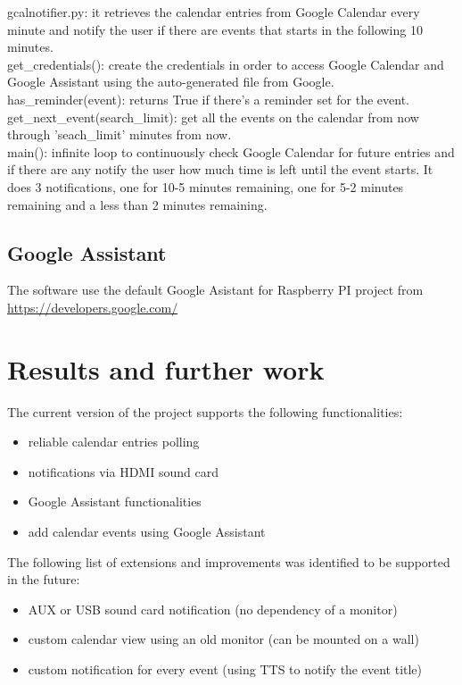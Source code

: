 \documentclass[a4paper,11pt]{article}
\begin{document}
gcalnotifier.py: it retrieves the calendar entries from Google Calendar every minute and notify the user if there are events that starts in the following 10 minutes.\\ 

get\_credentials(): create the credentials in order to access Google Calendar and Google Assistant using the auto-generated file from Google.\\

has\_reminder(event): returns True if there's a reminder set for the event.\\

get\_next\_event(search\_limit): get all the events on the calendar from now through 'seach\_limit' minutes from now.\\

main(): infinite loop to continuously check Google Calendar for future entries and if there are any notify the user how much time is left until the event starts. It does 3 notifications, one for 10-5 minutes remaining, one for 5-2 minutes remaining and a less than 2 minutes remaining.\\

\subsection{Google Assistant}

The software use the default Google Asistant for Raspberry PI project from \url{https://developers.google.com/}

\section{Results and further work}

The current version of the project supports the following functionalities:
\begin{itemize}  
\item reliable calendar entries polling
\item notifications via HDMI sound card
\item Google Assistant functionalities
\item add calendar events using Google Assistant\\
\end{itemize}

The following list of extensions and improvements was identified to be supported in the future:
\begin{itemize}  
\item AUX or USB sound card notification (no dependency of a monitor)
\item custom calendar view using an old monitor (can be mounted on a wall)
\item custom notification for every event (using TTS to notify the event title)
\end{itemize}
\end{document}
